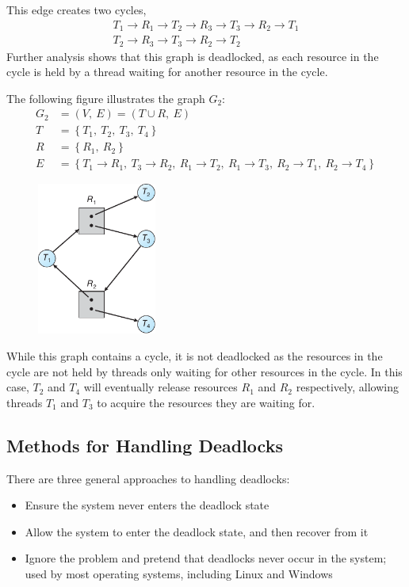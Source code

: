 \documentclass{article}
\begin{document}
This edge creates two cycles,
\begin{gather*}
    T_1 \rightarrow R_1 \rightarrow T_2 \rightarrow R_3 \rightarrow T_3 \rightarrow R_2 \rightarrow T_1 \\
    T_2 \rightarrow R_3 \rightarrow T_3 \rightarrow R_2 \rightarrow T_2
\end{gather*}
Further analysis shows that this graph is deadlocked, as each resource
in the cycle is held by a thread waiting for another resource in the
cycle.

The following figure illustrates the graph \(G_2\):
\begin{align*}
    G_2 & = \left( V,\: E \right) = \left( T \cup R,\: E \right) \\
    T   & = \left\{ T_1,\: T_2,\: T_3,\: T_4 \right\}            \\
    R   & = \left\{ R_1,\: R_2 \right\}                          \\
    E   & = \left\{
    T_1 \rightarrow R_1,\: T_3 \rightarrow R_2,\:
    R_1 \rightarrow T_2,\: R_1 \rightarrow T_3,\:
    R_2 \rightarrow T_1,\: R_2 \rightarrow T_4
    \right\}
\end{align*}
\begin{figure}[H]
    \centering
    \includegraphics[height = 5cm]{figures/resource_allocation_graph_3.pdf}
\end{figure}
While this graph contains a cycle, it is not deadlocked as the resources
in the cycle are not held by threads only waiting for other resources
in the cycle. In this case, \(T_2\) and \(T_4\) will eventually release
resources \(R_1\) and \(R_2\) respectively, allowing threads \(T_1\)
and \(T_3\) to acquire the resources they are waiting for.
\subsection{Methods for Handling Deadlocks}
There are three general approaches to handling deadlocks:
\begin{itemize}
    \item Ensure the system never enters the deadlock state
    \item Allow the system to enter the deadlock state, and then
          recover from it
    \item Ignore the problem and pretend that deadlocks never occur in
          the system; used by most operating systems, including Linux
          and Windows
\end{itemize}
\end{document}
